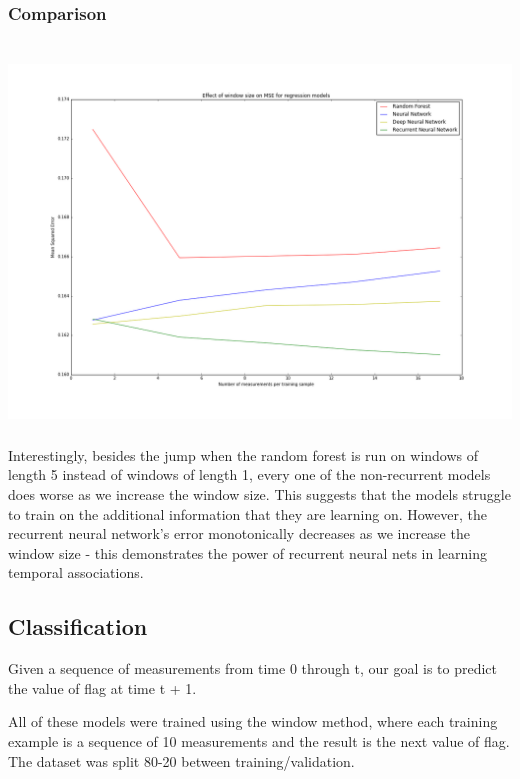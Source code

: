 \documentclass[12pt,a4paper]{article}
\begin{document}
\subsubsection{Comparison}
\includegraphics[height=400px, width=1.1\textwidth]{len_sequence_v_MSE}
Interestingly, besides the jump when the random forest is run on windows of length 5 instead of windows of length 1, every one of the non-recurrent models does worse as we increase the window size.  This suggests that the models struggle to train on the additional information that they are learning on.  However, the recurrent neural network's error monotonically decreases as we increase the window size - this demonstrates the power of recurrent neural nets in learning temporal associations.  

\subsection{Classification}
Given a sequence of measurements from time 0 through t, our goal is to predict the value of flag at time t + 1.  

All of these models were trained using the window method, where each training example is a sequence of 10 measurements and the result is the next value of flag.  The dataset was split 80-20 between training/validation.
\end{document}
